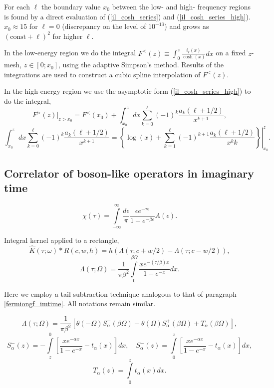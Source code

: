 \documentclass[]{article}
\begin{document}
For each $\ell$ the boundary value $x_0$ between the low- and high- frequency regions is found by a direct evaluation of (\ref{il_cosh_series}) and (\ref{il_cosh_series_high}). $x_0\approx15$ for $\ell=0$ (discrepancy on the level of $10^{-13}$) and grows as $(\mathrm{const}+\ell)^2$ for higher $\ell$.

In the low-energy region we do the integral $F^<(z) \equiv \int_0^z \frac{i_\ell(x)}{\cosh(x)} dx$ on a fixed $z$-mesh, $z\in[0;x_0]$, using the adaptive Simpson's method. Results of the integrations are used to construct a cubic spline interpolation of $F^<(z)$.

In the high-energy region we use the asymptotic form (\ref{il_cosh_series_high}) to do the integral,
\begin{equation}
	F^>(z)|_{z>x_0} = F^<(x_0) +
		\int_{x_0}^z dx \sum_{k=0}^\ell(-1)^k \frac{a_k(\ell+1/2)}{x^{k+1}},
\end{equation}
\begin{equation}
	\int_{x_0}^z dx \sum_{k=0}^\ell(-1)^k \frac{a_k(\ell+1/2)}{x^{k+1}} =
	\left.\left\{
		\log(x) +
		\sum_{k=1}^\ell (-1)^{k+1}\frac{a_k(\ell+1/2)}{x^k k}
	\right\}\right|_{x_0}^z.
\end{equation}

\subsection{Correlator of boson-like operators in imaginary time}
\label{bosoncorr_imtime}
\begin{equation}
	\chi(\tau) = \int\limits_{-\infty}^\infty \frac{d\epsilon}{\pi}
	\frac{\epsilon e^{-\tau\epsilon}}{1-e^{-\beta\epsilon}} A(\epsilon).
\end{equation}

Integral kernel applied to a rectangle,
\begin{equation}
\hat K(\tau;\omega)*R(c,w,h) =
h(\Lambda(\tau;c+w/2) - \Lambda(\tau;c-w/2)),
\end{equation}
\begin{equation}
\Lambda(\tau;\Omega) = \frac{1}{\pi\beta^2}
\int\limits_0^{\beta\Omega}\frac{xe^{-(\tau/\beta)x}}{1-e^{-x}}dx.
\end{equation}

Here we employ a tail subtraction technique analogous to that of paragraph
\ref{fermiongf_imtime}. All notations remain similar.

\begin{equation}
	\Lambda(\tau;\Omega) = \frac{1}{\pi\beta^2} \left[
	\theta(-\Omega)S^-_\alpha(\beta\Omega) +
	\theta(\Omega)S^+_\alpha(\beta\Omega) +
	T_\alpha(\beta\Omega)
	\right],
\end{equation}
\begin{equation}
	S^-_\alpha(z) = -\int\limits_z^0
	\left[\frac{xe^{-\alpha x}}{1-e^{-x}} - t_\alpha(x)
	\right] dx,\quad
	S^+_\alpha(z) = \int\limits_0^z
	\left[\frac{xe^{-\alpha x}}{1-e^{-x}} - t_\alpha(x)
	\right] dx,
\end{equation}
\begin{equation}
	T_\alpha(z) = \int\limits_0^z t_\alpha(x) dx.
\end{equation}
\end{document}
